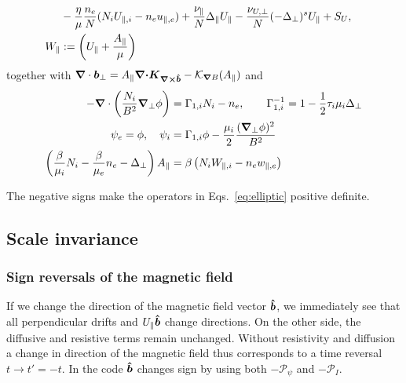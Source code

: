 \begin{subequations}
\begin{align}
\nonumber \\&
\vphantom{\frac{\vec b\times\vn \psi}{B}} %
        - \frac{\eta}{\mu} \frac{n_e}{N}(N_iU_{\parallel,i} - n_eu_{\parallel,e})
        + \frac{\nu_\parallel}{N} \Delta_\parallel U_\parallel - \frac{\nu_{U,\perp}}{N}(-\Delta_\perp)^s U_\parallel
    + S_U
    ,
        \label{eq:EgyrofluidU} \\
        W_\parallel&:= \left( U_\parallel + \frac{A_\parallel}{\mu}\right)
    \end{align}
    \label{eq:Egyrofluid}
\end{subequations}
together with
${\boldsymbol{\nabla}}\cdot { {\boldsymbol{b}}}_\perp = A_\parallel {\boldsymbol{{\boldsymbol{\nabla}}\cdot}}{\boldsymbol{ { K}_{{\boldsymbol{\nabla}}\times\bm{\hat{b}}}}} - \mathcal K_{{\boldsymbol{\nabla}} B}(A_\parallel) $
and
\begin{subequations} \label{eq:elliptic}
  \begin{align}
    -{\boldsymbol{\nabla}}\cdot\left( \frac{N_i}{B^2}{\boldsymbol{\nabla}}_{\perp} \phi \right) &= \Gamma_{1,i} N_i - n_e, \quad\quad
    \Gamma_{1,i}^{-1} = 1-\frac{1}{2}\tau_i\mu_i \Delta_\perp \\
    \psi_e = \phi, \quad \psi_i &= \Gamma_{1,i}\phi -\frac{\mu_i}{2}\frac{({\boldsymbol{\nabla}}_{\perp}\phi)^2}{B^2} \\
    \left(\frac{\beta}{\mu_i}N_i - \frac{\beta}{\mu_e}n_e-\Delta_\perp\right)
    A_\parallel &= \beta\left(N_iW_{\parallel,i}-n_e w_{\parallel,e}\right)
  \end{align}
\end{subequations}
\begin{tcolorbox}[title=Note]
The negative signs make the operators in Eqs.~\eqref{eq:elliptic} positive definite.
\end{tcolorbox}

\subsection{Scale invariance}
\subsubsection{Sign reversals of the magnetic field}\label{sec:field_reversal}
If we change the direction of the magnetic field vector $\bm{\hat{b}}$, we immediately see that all perpendicular
drifts and $U_\parallel\bm{\hat{b}}$ change directions. On the other side, the diffusive and resistive terms remain unchanged.
Without resistivity and diffusion a change in direction of the magnetic field thus corresponds to
a time reversal $t\rightarrow t'=-t$.
In the code $\bm{\hat{b}}$ changes sign by using both $-\mathcal P_\psi$ and $-\mathcal P_I$.

